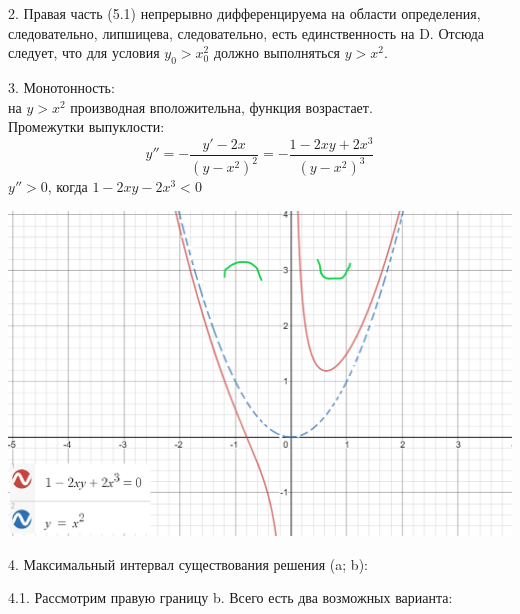 \documentclass[10pt]{report}
\begin{document}
2. Правая часть (5.1) непрерывно дифференцируема на области определения, следовательно, липшицева, следовательно, есть единственность на D. Отсюда следует, что для условия $y_0>x_0^2$  должно выполняться $y>x^2$.

3. Монотонность:\\
на $y>x^2$ производная вположительна, функция возрастает.\\
Промежутки выпуклости:
\[ y'' = - \frac {y'-2x} {(y-x^2)^2} = - \frac {1-2xy+2x^3} {(y-x^2)^3}\]
$ y''>0$, когда $1-2xy-2x^3<0$
\begin{center}
{\includegraphics[scale=0.4]{graph5.1.png}} 
\end{center}

4. Максимальный интервал существования решения (a; b):

4.1. Рассмотрим правую границу b. Всего есть два возможных варианта:
\end{document}
